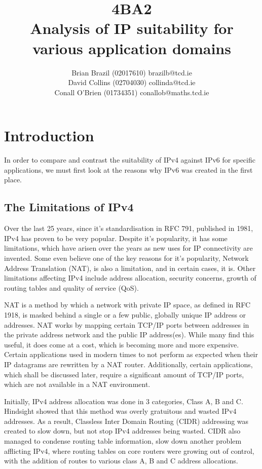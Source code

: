 \documentclass[a4paper,12pt]{article}
\begin{document}
\title{4BA2 \\ Analysis of IP suitability for various application domains}

\author{Brian Brazil (02017610) brazilb@tcd.ie \\
David Collins (02704030) collinda@tcd.ie \\ 
Conall O'Brien (01734351) conallob@maths.tcd.ie}

\maketitle

\section{Introduction}

In order to compare and contrast the suitability of IPv4 against IPv6
for specific applications, we must first look at the reasons why IPv6
was created in the first place.

\subsection{The Limitations of IPv4}

Over the last 25 years, since it's standardisation in RFC 791, published
in 1981, IPv4 has proven to be very popular. Despite it's popularity, it 
has some limitations, which have arisen over the years as new uses for 
IP connectivity are invented. Some even believe one of the key reasons
for it's popularity, Network Address Translation (NAT), is also a 
limitation, and in certain cases, it is. Other limitations
affecting IPv4 include address allocation, security concerns, growth of 
routing tables and quality of service (QoS).


NAT is a method by which a network with private IP space, as defined in
RFC 1918, is masked behind a single or a few public, globally unique IP
address or addresses. NAT works by mapping certain TCP/IP ports between
addresses in the private address network and the public IP address(es).
While many find this useful, it does come at a cost, which is becoming
more and more expensive. Certain applications used in modern times to
not perform as expected when their IP datagrams are rewritten by a NAT
router. Additionally, certain applications, which shall be discussed
later, require a significant amount of TCP/IP ports, which are not
available in a NAT environment.


Initially, IPv4 address allocation was done in 3 categories, Class A, B
and C. Hindsight showed that this method was overly gratuitous and
wasted IPv4 addresses. As a result, Classless Inter Domain Routing
(CIDR) addressing was created to slow down, but not stop IPv4 addresses
being wasted. CIDR also managed to condense routing table information,
slow down another problem afflicting IPv4, where routing tables on core
routers were growing out of control, with the addition of routes to
various class A, B and C address allocations.
\end{document}
